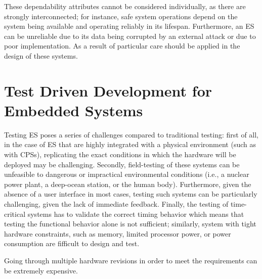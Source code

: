 These dependability attributes cannot be considered individually, as there are strongly interconnected; for instance, safe system operations depend on the system being available and operating reliably in its lifespan. Furthermore, an ES can be unreliable due to its data being corrupted by an external attack or due to poor implementation. As a result of particular care should be applied in the design of these systems. 





\section{Test Driven Development for Embedded Systems}
Testing ES poses a series of challenges compared to traditional testing: first of all, in the case of ES that are highly integrated with a physical environment (such as with CPSs), replicating the exact conditions in which the hardware will be deployed may be challenging. Secondly, field-testing of these systems can be unfeasible to dangerous or impractical environmental conditions (i.e., a nuclear power plant, a deep-ocean station, or the human body). Furthermore, given the absence of a user interface in most cases, testing such systems can be particularly challenging, given the lack of immediate feedback. Finally, the testing of time-critical systems has to validate the correct timing behavior which means that testing the functional behavior alone is not sufficient; similarly, system with tight hardware constraints, such as memory, limited processor power, or power consumption are fifficult to design and test.

Going through multiple hardware revisions in order to meet the requirements can be extremely expensive.


